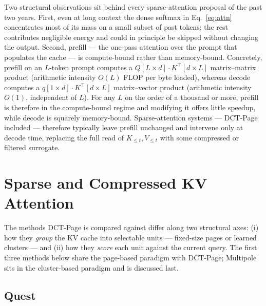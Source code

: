 Two structural observations sit behind every sparse-attention
proposal of the past two years.  First, even at long context the
dense softmax in Eq.~\eqref{eq:attn} concentrates most of its mass
on a small subset of past tokens; the rest contributes negligible
energy and could in principle be skipped without changing the output.
Second, prefill --- the one-pass attention over the prompt that
populates the cache --- is compute-bound rather than memory-bound.
Concretely, prefill on an $L$-token prompt computes a $Q[L \times d]
\cdot K^{\top}[d \times L]$ matrix--matrix product (arithmetic
intensity $O(L)$ FLOP per byte loaded), whereas decode computes a
$q[1 \times d] \cdot K^{\top}[d \times L]$ matrix--vector product
(arithmetic intensity $O(1)$, independent of $L$).  For any $L$ on
the order of a thousand or more, prefill is therefore in the
compute-bound regime and modifying it offers little speedup, while
decode is squarely memory-bound.  Sparse-attention
systems --- DCT-Page included --- therefore typically leave prefill
unchanged and intervene only at decode time, replacing the full read
of $K_{\le t}, V_{\le t}$ with some compressed or filtered surrogate.


\section{Sparse and Compressed KV Attention}\label{sec:related-sparse}

The methods DCT-Page is compared against differ along two structural
axes: (i) how they \emph{group} the KV cache into selectable units
--- fixed-size pages or learned clusters --- and (ii) how they
\emph{score} each unit against the current query.  The first three
methods below share the page-based paradigm with DCT-Page; Multipole
sits in the cluster-based paradigm and is discussed last.

\subsection{Quest}\label{sec:rel-quest}

